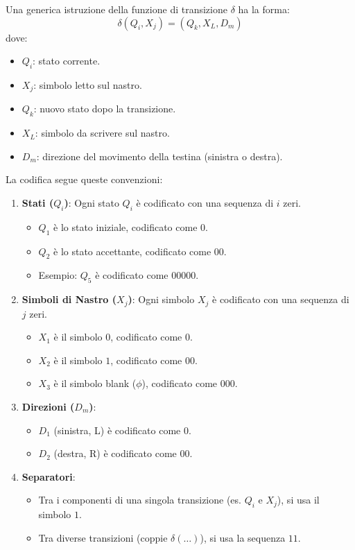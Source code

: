 \documentclass[a4paper]{article}
\begin{document}
Una generica istruzione della funzione di transizione $\delta$ ha la forma:
\[ \delta(Q_i, X_j) = (Q_k, X_L, D_m) \]
dove:
\begin{itemize}
    \item $Q_i$: stato corrente.
    \item $X_j$: simbolo letto sul nastro.
    \item $Q_k$: nuovo stato dopo la transizione.
    \item $X_L$: simbolo da scrivere sul nastro.
    \item $D_m$: direzione del movimento della testina (sinistra o destra).
\end{itemize}

La codifica segue queste convenzioni:
\begin{enumerate}
    \item \textbf{Stati ($Q_i$)}: Ogni stato $Q_i$ è codificato con una sequenza di $i$ zeri.
    \begin{itemize}
        \item $Q_1$ è lo stato iniziale, codificato come $0$.
        \item $Q_2$ è lo stato accettante, codificato come $00$.
        \item Esempio: $Q_5$ è codificato come $00000$.
    \end{itemize}
    \item \textbf{Simboli di Nastro ($X_j$)}: Ogni simbolo $X_j$ è codificato con una sequenza di $j$ zeri.
    \begin{itemize}
        \item $X_1$ è il simbolo $0$, codificato come $0$.
        \item $X_2$ è il simbolo $1$, codificato come $00$.
        \item $X_3$ è il simbolo blank ($\phi$), codificato come $000$.
    \end{itemize}
    \item \textbf{Direzioni ($D_m$)}:
    \begin{itemize}
        \item $D_1$ (sinistra, L) è codificato come $0$.
        \item $D_2$ (destra, R) è codificato come $00$.
    \end{itemize}
    \item \textbf{Separatori}:
    \begin{itemize}
        \item Tra i componenti di una singola transizione (es. $Q_i$ e $X_j$), si usa il simbolo $1$.
        \item Tra diverse transizioni (coppie $\delta(\dots)$), si usa la sequenza $11$.
    \end{itemize}
\end{enumerate}
\end{document}
